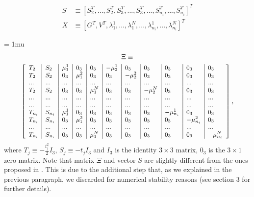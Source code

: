 \documentclass[letterpaper, 10 pt, journal, twoside]{IEEEtran}  %
\begin{document}
\begin{equation*}
  \begin{aligned}
S &\equiv [S_2^T, ...,S_2^T, S_3^T,...,S_3^T,...,S_{n_i}^T,...,S_{n_i}^T]^T \\
X &\equiv [ G^T, V^T, \lambda_1^1, ..., \lambda_1^N, ..., \lambda_{n_i}^1, ..., \lambda_{n_i}^N]^T
  \end{aligned}
\end{equation*}
\vspace{-1cm}

{
\arraycolsep=3pt %
\medmuskip = 1mu %
\begin{multline*}
  \Xi \equiv \\
      {
        \footnotesize
        \left[
          \begin{array}{l|l|l|l|l|l|l|l|l|l|l}
            T_2 & S_2 & \mu_1^1 & 0_3 & 0_3 & -\mu_2^1 & 0_3 & 0_3 & 0_3 & 0_3 & 0_3 \\
            T_2 & S_2 & 0_3 & \mu_1^2 & 0_3 & 0_3 & -\mu_2^2 & 0_3 & 0_3 & 0_3 & 0_3 \\
            ... & ... & ... & ... & ... & ... & ... & ... & ... & ... & ... \\
            T_2 & S_2 & 0_3 & 0_3 & \mu_1^N & 0_3 & 0_3 & -\mu_2^N & 0_3 & 0_3 & 0_3 \\
            ... & ... & ... & ... & ... & ... & ... & ... & ... & ... & ... \\
            ... & ... & ... & ... & ... & ... & ... & ... & ... & ... & ... \\
            T_{n_i} & S_{n_i} & \mu_1^1 & 0_3 & 0_3 & 0_3 & 0_3 & 0_3 & -\mu_{n_i}^1 & 0_3 & 0_3 \\
            T_{n_i} & S_{n_i} & 0_3 & \mu_1^2 & 0_3 & 0_3 & 0_3 & 0_3 & 0_3 & -\mu_{n_i}^2 & 0_3 \\
            ... & ... & ... & ... & ... & ... & ... & ... & ... & ... & ... \\
            T_{n_i} & S_{n_i} & 0_3 & 0_3 & \mu_1^N & 0_3 & 0_3 & 0_3 & 0_3 & 0_3 & -\mu_{n_i}^N
          \end{array}
          \right],
      }
\end{multline*}
}
\noindent where $T_j \equiv - \frac{t^2_j}{2} I_3$, $S_j \equiv -t_j I_3$ and $I_3$ is the identity $3\times 3$ matrix, $0_3$ is the $3\times 1$ zero matrix.
Note that matrix $\Xi$ and vector $S$ are slightly different from the ones proposed in \cite{Martinelli2014}.
This is due to the additional step that, as we explained in the previous paragraph, we discarded for numerical stability reasons (see \cite{Martinelli2014} section 3 for further details).
\end{document}
